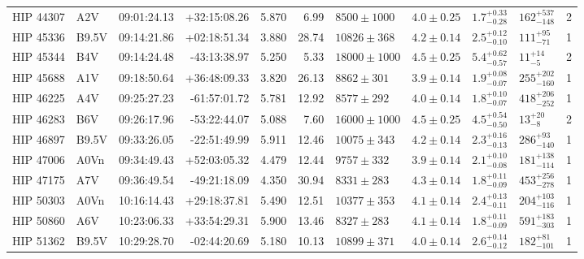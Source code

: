 \begin{landscape}
\begin{scriptsize}
\begin{longtable}{|l|lrrrrlllll|}
   HIP 44307 &      A2V &    09:01:24.13 &   +32:15:08.26 &   5.870 &      6.99 &   $8500 \pm 1000$ &  $4.0 \pm 0.25$ &  $1.7^{+0.33}_{-0.28}$ &   $162^{+537}_{-148}$ &       2 \\
   HIP 45336 &    B9.5V &    09:14:21.86 &   +02:18:51.34 &   3.880 &     28.74 &   $10826 \pm 368$ &  $4.2 \pm 0.14$ &  $2.5^{+0.12}_{-0.10}$ &     $111^{+95}_{-71}$ &       1 \\
   HIP 45344 &      B4V &    09:14:24.48 &   -43:13:38.97 &   5.250 &      5.33 &  $18000 \pm 1000$ &  $4.5 \pm 0.25$ &  $5.4^{+0.62}_{-0.57}$ &       $11^{+14}_{-5}$ &       2 \\
   HIP 45688 &      A1V &    09:18:50.64 &   +36:48:09.33 &   3.820 &     26.13 &    $8862 \pm 301$ &  $3.9 \pm 0.14$ &  $1.9^{+0.08}_{-0.07}$ &   $255^{+202}_{-160}$ &       1 \\
   HIP 46225 &      A4V &    09:25:27.23 &   -61:57:01.72 &   5.781 &     12.92 &    $8577 \pm 292$ &  $4.0 \pm 0.14$ &  $1.8^{+0.10}_{-0.07}$ &   $418^{+206}_{-252}$ &       1 \\
   HIP 46283 &      B6V &    09:26:17.96 &   -53:22:44.07 &   5.088 &      7.60 &  $16000 \pm 1000$ &  $4.5 \pm 0.25$ &  $4.5^{+0.54}_{-0.50}$ &       $13^{+20}_{-8}$ &       2 \\
   HIP 46897 &    B9.5V &    09:33:26.05 &   -22:51:49.99 &   5.911 &     12.46 &   $10075 \pm 343$ &  $4.2 \pm 0.14$ &  $2.3^{+0.16}_{-0.13}$ &    $286^{+93}_{-140}$ &       1 \\
   HIP 47006 &     A0Vn &    09:34:49.43 &   +52:03:05.32 &   4.479 &     12.44 &    $9757 \pm 332$ &  $3.9 \pm 0.14$ &  $2.1^{+0.10}_{-0.08}$ &   $181^{+138}_{-114}$ &       1 \\
   HIP 47175 &      A7V &    09:36:49.54 &   -49:21:18.09 &   4.350 &     30.94 &    $8331 \pm 283$ &  $4.3 \pm 0.14$ &  $1.8^{+0.11}_{-0.09}$ &   $453^{+256}_{-278}$ &       1 \\
   HIP 50303 &     A0Vn &    10:16:14.43 &   +29:18:37.81 &   5.490 &     12.51 &   $10377 \pm 353$ &  $4.1 \pm 0.14$ &  $2.4^{+0.13}_{-0.11}$ &   $204^{+103}_{-116}$ &       1 \\
   HIP 50860 &      A6V &    10:23:06.33 &   +33:54:29.31 &   5.900 &     13.46 &    $8327 \pm 283$ &  $4.1 \pm 0.14$ &  $1.8^{+0.11}_{-0.09}$ &   $591^{+183}_{-303}$ &       1 \\
   HIP 51362 &    B9.5V &    10:29:28.70 &   -02:44:20.69 &   5.180 &     10.13 &   $10899 \pm 371$ &  $4.0 \pm 0.14$ &  $2.6^{+0.14}_{-0.12}$ &    $182^{+81}_{-101}$ &       1 \\

\end{longtable}
\end{scriptsize}
\end{landscape}
